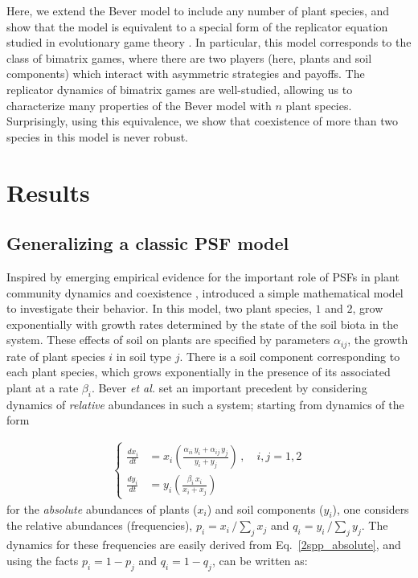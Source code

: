 \documentclass[11pt]{article}
\begin{document}
Here, we extend the Bever model to include any number of plant species, and show that the model is equivalent to a special form of the replicator equation studied in evolutionary game theory \citep{hofbauer1998evolutionary}. In particular, this model corresponds to the class of bimatrix games, where there are two players (here, plants and soil components) which interact with asymmetric strategies and payoffs. The replicator dynamics of bimatrix games are well-studied, allowing us to characterize many properties of the Bever model with $n$ plant species. Surprisingly, using this equivalence, we show that coexistence of more than two species in this model is never robust. 

\section{Results}

\subsection{Generalizing a classic PSF model}

Inspired by emerging empirical evidence for the important role of PSFs in plant community dynamics and coexistence \citep{van1993plant,bever1994feedback}, \citet{bever1997incorporating} introduced a simple mathematical model to investigate their behavior. In this model, two plant species, $1$ and $2$, grow exponentially with growth rates determined by the state of the soil biota in the system. These effects of soil on plants are specified by parameters $\alpha_{ij}$, the growth rate of plant species $i$ in soil type $j$. There is a soil component corresponding to each plant species, which grows exponentially in the presence of its associated plant at a rate $\beta_i$. Bever \textit{et al.} set an important precedent by considering dynamics of \emph{relative} abundances in such a system; starting from dynamics of the form

\begin{align} \label{2spp_absolute}
	\begin{cases}
	\frac{dx_i}{dt} &= x_i \left( \frac{\alpha_{ii} \, y_i + \alpha_{ij} \, y_j}{y_i + y_j} \right) \, , \quad  i, j = 1,2 \\
	\frac{dy_i}{dt} &= y_i \left( \frac{\beta_i \, x_i}{x_i + x_j} \right)
	\end{cases}
\end{align}
for the \emph{absolute} abundances of plants ($x_i$) and soil components ($y_i$), one considers the relative abundances (frequencies), $p_i = x_i \, / \sum_j x_j$ and $q_i = y_i \, / \sum_{j} y_j$. The dynamics for these frequencies are easily derived from Eq.~\ref{2spp_absolute}, and using the facts $p_i = 1 - p_j$ and $q_i = 1 - q_j$, can be written as:
\end{document}
